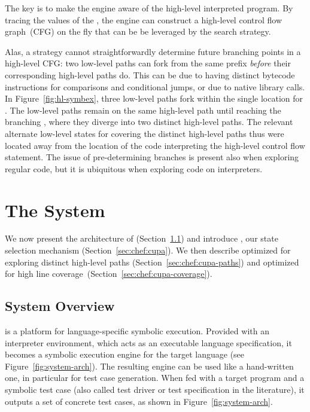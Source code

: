 The key is to make the engine aware of the high-level interpreted program. By tracing the values of the \hlpc, the engine can construct a high-level control flow graph~(CFG) on the fly that can be be leveraged by the search strategy.

Alas, a strategy cannot straightforwardly determine future branching points in a high-level CFG: two low-level paths can fork from the same prefix \emph{before} their corresponding high-level paths do.  This can be due to having distinct bytecode instructions for comparisons and conditional jumps, or due to native library calls.  
%
In Figure~\ref{fig:hl-symbex}, three low-level paths fork within the single \hlpc location for . The low-level paths remain on the same high-level path until reaching the branching \hlpc, where they diverge into two distinct high-level paths. The relevant alternate low-level states for covering the distinct high-level paths thus were located away from the location of the code interpreting the high-level control flow statement.
%
The issue of pre-determining branches is present also when exploring regular code, but it is ubiquitous when exploring code on interpreters.

\section{The \chef System}

We now present the architecture of \chef (Section~\ref{sec:chef:architecture}) and introduce \cupa, our state selection mechanism (Section~\ref{sec:chef:cupa}). We then describe \cupa optimized for exploring distinct high-level paths (Section~\ref{sec:chef:cupa-paths}) and optimized for high line coverage~(Section~\ref{sec:chef:cupa-coverage}).

\subsection{System Overview}
\label{sec:chef:architecture}

\chef is a platform for language-specific symbolic execution. Provided with an interpreter environment, which acts as an executable language specification, it becomes a symbolic execution engine for the target language (see Figure~\ref{fig:system-arch}).
%
The resulting engine can be used like a hand-written one, in particular for test case generation. When fed with a target program and a symbolic test case (also called test driver or test specification in the literature), it outputs a set of concrete test cases, as shown in Figure~\ref{fig:system-arch}.

